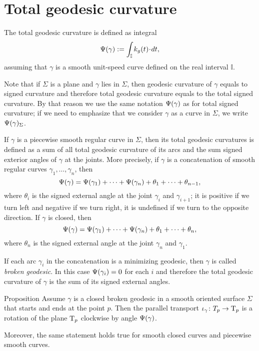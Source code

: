 \section{Total geodesic curvature}

The total geodesic curvature is defined as integral 
\[\tgc\gamma
\df
\int_{\mathbb{I}} k_g(t)\cdot dt,\]
assuming that $\gamma$ is a smooth unit-speed curve defined on the real interval $\mathbb{I}$.

Note that if $\Sigma$ is a plane and $\gamma$ lies in $\Sigma$, then geodesic curvature of $\gamma$ equals to signed curvature and therefore total geodesic curvature equals to the total signed curvature.
By that reason we use the same notation $\Psi({\gamma})$ as for total signed curvature; if we need to emphasize that we consider $\gamma$ as a curve in $\Sigma$, we write $\Psi({\gamma})_\Sigma$.

If $\gamma$ is a piecewise smooth regular curve in $\Sigma$, then
its total geodesic curvatures is defined as a sum of all total geodesic curvature of its arcs and the sum signed exterior angles of $\gamma$ at the joints.
More precisely, if $\gamma$ is a concatenation of smooth regular curves $\gamma_1,\dots,\gamma_n$, then
\[\Psi({\gamma})=\Psi({\gamma_1})+\dots+\Psi({\gamma_n})+\theta_1+\dots+\theta_{n-1},\]
where $\theta_i$ is the signed external angle at the joint $\gamma_i$ and $\gamma_{i+1}$; it is positive if we turn left and negative if we turn right, it is undefined if we turn to the opposite direction.
If $\gamma$ is closed, then 
\[\Psi({\gamma})=\Psi({\gamma_1})+\dots+\Psi({\gamma_n})+\theta_1+\dots+\theta_{n},\]
where $\theta_n$ is the signed external angle at the joint $\gamma_n$ and $\gamma_1$.

If each arc $\gamma_i$ in the concatenation is a minimizing geodesic, then $\gamma$ is called \emph{broken geodesic}.
In this case $\Psi({\gamma_i})=0$ for each $i$ and therefore the total geodesic curvature of $\gamma$ is the sum of its signed external angles.

\begin{thm}{Proposition}\label{prop:pt+tgc}
Assume $\gamma$ is a closed broken geodesic in a smooth oriented surface $\Sigma$ that starts and ends at the point $p$.
Then the parallel transport $\iota_\gamma\colon T_p\to\mathrm{T}_p$ is a rotation of the plane $\mathrm{T}_p$ clockwise by angle $\Psi({\gamma})$.

Moreover, the same statement holds true for smooth closed curves and piecewise smooth curves.
\end{thm}

